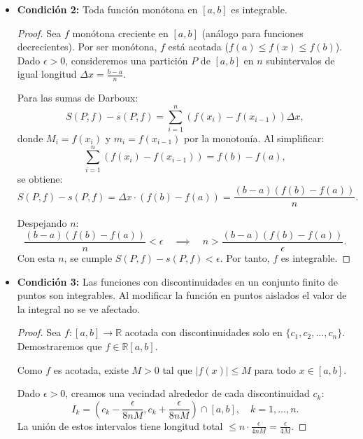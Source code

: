 \documentclass{article}
\begin{document}
\begin{enumerate}
\begin{itemize}
        \item \textbf{Condición 2:} Toda función monótona en \([a, b]\) es integrable.
            \begin{proof}
                Sea \( f \) monótona creciente en \([a, b]\) (análogo para funciones decrecientes). Por ser monótona, \( f \) está acotada (\( f(a) \leq f(x) \leq f(b) \)). Dado \( \epsilon > 0 \), consideremos una partición \( P \) de \([a, b]\) en \( n \) subintervalos de igual longitud \( \Delta x = \frac{b - a}{n} \). 

                Para las sumas de Darboux:
                \[
                S(P,f) - s(P,f) = \sum_{i=1}^n \left(f(x_i) - f(x_{i-1})\right)\Delta x,
                \]
                donde \( M_i = f(x_i) \) y \( m_i = f(x_{i-1}) \) por la monotonía. Al simplificar:
                \[
                \sum_{i=1}^n \left(f(x_i) - f(x_{i-1})\right) = f(b) - f(a),
                \]
                se obtiene:
                \[
                S(P,f) - s(P,f) = \Delta x \cdot \left(f(b) - f(a)\right) = \frac{(b - a)(f(b) - f(a))}{n}.
                \]
                
                Despejando \( n \):
                \[
                \frac{(b - a)(f(b) - f(a))}{n} < \epsilon \quad \implies \quad n > \frac{(b - a)(f(b) - f(a))}{\epsilon}.
                \]
                Con esta \( n \), se cumple \( S(P,f) - s(P,f) < \epsilon \). Por tanto, \( f \) es integrable.
            \end{proof}
            
        \item \textbf{Condición 3:} Las funciones con discontinuidades en un conjunto finito de puntos son integrables. Al modificar la función en  puntos aislados el valor de la integral no se ve afectado.
            \begin{proof}
                Sea \( f: [a,b] \to \mathbb{R} \) acotada con discontinuidades solo en \( \{c_1, c_2, ..., c_n\} \). Demostraremos que \( f \in \mathbb{R}[a,b] \).

                Como \( f \) es acotada, existe \( M > 0 \) tal que \( |f(x)| \leq M \) para todo \( x \in [a,b] \).

                Dado \( \epsilon > 0 \), creamos una vecindad alrededor de cada discontinuidad \( c_k \):
                \[
                I_k = \left(c_k - \frac{\epsilon}{8nM}, c_k + \frac{\epsilon}{8nM}\right) \cap [a,b], \quad k = 1, \ldots, n.
                \]
                La unión de estos intervalos tiene longitud total \( \leq n \cdot \frac{\epsilon}{4nM} = \frac{\epsilon}{4M} \).


\end{proof}
\end{itemize}
\end{enumerate}
\end{document}
